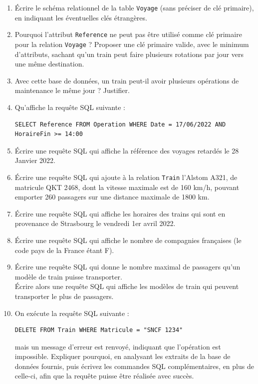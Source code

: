 \documentclass[11pt,a4paper,french,twoside]{PMCours}
\begin{document}
\begin{enumerate}
\item Écrire le schéma relationnel de la table \verb'Voyage' (sans préciser de clé primaire), en indiquant les éventuelles clés étrangères.
\item Pourquoi l'attribut \verb'Reference' ne peut pas être utilisé comme clé primaire pour la relation \verb'Voyage' ? Proposer une clé primaire valide, avec le minimum d'attributs, sachant qu'un train peut faire plusieurs rotations par jour vers une même destination.
\item Avec cette base de données, un train peut-il avoir plusieurs opérations de maintenance le même jour ? Justifier.
\item Qu'affiche la requête SQL suivante :
\begin{verbatim}
SELECT Reference FROM Operation WHERE Date = 17/06/2022 AND HoraireFin >= 14:00
\end{verbatim} 
\item Écrire une requête SQL qui affiche la référence des voyages retardés le 28 Janvier 2022.
\item Écrire une requête SQL qui ajoute à la relation \verb'Train' l'Alstom A321, de matricule QKT 2468, dont la vitesse maximale est de 160 km/h, pouvant emporter 260 passagers sur une distance maximale de 1800 km.
\item Écrire une requête SQL qui affiche les horaires des trains qui sont en provenance de Strasbourg le vendredi 1er avril 2022.
\item Écrire une requête SQL qui affiche le nombre de compagnies françaises (le code pays de la France étant F).
\item Écrire une requête SQL qui donne le nombre maximal de passagers qu'un modèle de train puisse transporter.\\
Écrire alors une requête SQL qui affiche les modèles de train qui peuvent transporter le plus de passagers.
\item On exécute la requête SQL suivante :
\begin{verbatim}
DELETE FROM Train WHERE Matricule = "SNCF 1234"
\end{verbatim} 
mais un message d'erreur est renvoyé, indiquant que l'opération est impossible. Expliquer pourquoi, en analysant les extraits de la base de données fournis, puis écrivez les commandes SQL complémentaires, en plus de celle-ci, afin que la requête puisse être réalisée avec succès.

\end{enumerate}
\end{document}
